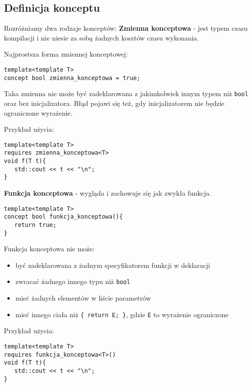 \documentclass[11pt, a4paper]{article}
\begin{document}
\lstset{language=C++}

\subsection{Definicja konceptu}

Rozróżniamy dwa rodzaje konceptów:\newline\newline
\noindent\textbf{Zmienna konceptowa} - jest typem czasu kompilacji i nie niesie za sobą żadnych kosztów czasu wykonania.\newline

\noindent Najprostsza forma zmiennej konceptowej:
\begin{lstlisting}[frame=single]
template<template T>
concept bool zmienna_konceptowa = true;
\end{lstlisting}

Taka zmienna nie może być zadeklarowana z jakimkolwiek innym typem niż \verb#bool# oraz bez inicjalizatora. Błąd pojawi się też, gdy inicjalizatorem nie będzie ograniczone wyrażenie.

\noindent Przykład użycia:
\begin{lstlisting}[frame=single]
template<template T>
requires zmienna_konceptowa<T>
void f(T t){
   std::cout << t << "\n";
}
\end{lstlisting}

\noindent\textbf{Funkcja konceptowa} - wygląda i zachowuje się jak zwykła funkcja.\newline
\begin{lstlisting}[frame=single]
template<template T>
concept bool funkcja_konceptowa(){
   return true;
}
\end{lstlisting}

Funkcja konceptowa nie może:
\begin{itemize}
\item być zadeklarowana z żadnym specyfikatorem funkcji w deklaracji
\item zwracać żadnego innego typu niż \verb#bool#
\item mieć żadnych elementów w liście parametrów
\item mieć innego ciała niż \verb#{ return E; }#, gdzie \verb#E# to wyrażenie ograniczone
\end{itemize}

\newpage
\noindent Przykład użycia:
\begin{lstlisting}[frame=single]
template<template T>
requires funkcja_konceptowa<T>()
void f(T t){
   std::cout << t << "\n";
}
\end{lstlisting}
\end{document}
